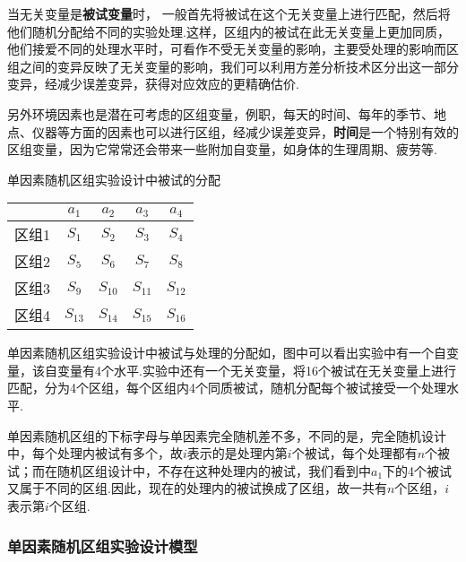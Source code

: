 当无关变量是\textbf{被试变量}时， 一般首先将被试在这个无关变量上进行匹配，然后将他们随机分配给不同的实验处理.这样，区组内的被试在此无关变量上更加同质，他们接爱不同的处理水平时，可看作不受无关变量的影响，主要受处理的影响而区组之间的变异反映了无关变量的影响，我们可以利用方差分析技术区分出这一部分变异，经减少误差变异，获得对应效应的更精确估价.

另外环境因素也是潜在可考虑的区组变量，例职，每天的时间、每年的季节、地点、仪器等方面的因素也可以进行区组，经减少误差变异，\textbf{时间}是一个特别有效的区组变量，因为它常常还会带来一些附加自变量，如身体的生理周期、疲劳等.



\begin{margintable}
	\centering
	\caption{单因素随机区组实验设计中被试的分配}
	{
			\begin{tabular}{ccccc}
			\toprule
			 & $a_1$ & $a_2$ & $a_3$ & $a_4$ \\
			\midrule
			区组1 & $S_1$ & $S_2$ & $S_3$ & $S_4$ \\
			区组2 & $S_5$ & $S_6$ & $S_7$ & $S_8$ \\
			区组3 & $S_9$ & $S_{10}$ & $S_{11}$ & $S_{12}$ \\
			区组4 & $S_{13}$ & $S_{14}$ & $S_{15}$ & $S_{16}$ \\
			\bottomrule
		\end{tabular}	
	}
\end{margintable}

单因素随机区组实验设计中被试与处理的分配如，图中可以看出实验中有一个自变量，该自变量有4个水平.实验中还有一个无关变量，将16个被试在无关变量上进行匹配，分为4个区组，每个区组内4个同质被试，随机分配每个被试接受一个处理水平.

单因素随机区组的下标字母与单因素完全随机差不多，不同的是，完全随机设计中，每个处理内被试有多个，故$i$表示的是处理内第$i$个被试，每个处理都有$n$个被试；而在随机区组设计中，不存在这种处理内的被试，我们看到中$a_1$下的4个被试又属于不同的区组.因此，现在的处理内的被试换成了区组，故一共有$n$个区组，$i$表示第$i$个区组.

\subsubsection{单因素随机区组实验设计模型}

